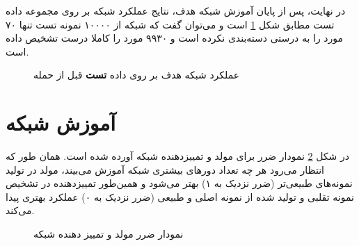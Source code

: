 در نهایت، پس از پایان آموزش شبکه هدف، نتایج عملکرد شبکه بر روی مجموعه داده تست مطابق شکل 
\ref{testset_statistics_before}
است و می‌توان گفت که شبکه از ۱۰۰۰۰ نمونه تست تنها ۷۰ مورد را به درستی دسته‌بندی نکرده است و ۹۹۳۰ مورد را کاملا درست تشخیص داده است.
\begin{figure}[H]
	\caption{عملکرد شبکه هدف بر روی داده
		 \textbf{تست}
		  قبل از حمله}
	\label{testset_statistics_before}
\end{figure}

\newpage
\section{آموزش شبکه
}
در شکل 
\ref{discriminator_generator_GAN_model_performance}
نمودار ضرر برای مولد و تمییزدهنده شبکه 
آورده شده است. همان طور که انتظار می‌رود هر چه تعداد دورهای بیشتری شبکه آموزش می‌بیند، مولد در تولید نمونه‌های طبیعی‌تر (ضرر نزدیک به ۱) بهتر می‌شود و همین‌طور تمییزدهنده در تشخیص نمونه تقلبی و تولید شده از نمونه‌ اصلی و طبیعی (ضرر نزدیک به ۰) عملکرد بهتری پیدا می‌کند.
\begin{figure}[H]
	\caption{نمودار ضرر مولد و تمییز دهنده شبکه
	}
	\label{discriminator_generator_GAN_model_performance}
\end{figure}

